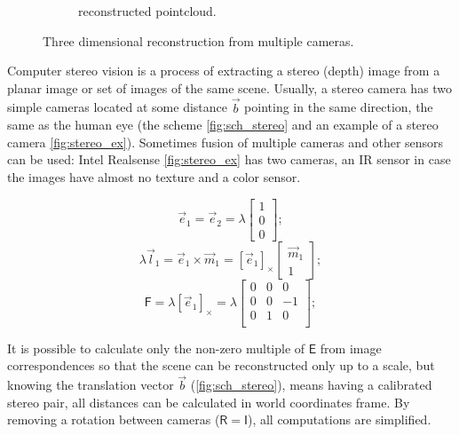 \begin{figure}[h]
\begin{subfigure}[b]{0.65\textwidth}
      \caption{reconstructed pointcloud.}
      \label{fig:pc_output}
    \end{subfigure}
    \caption{Three dimensional reconstruction from multiple cameras.}
    \label{fig:pc_recons}
\end{figure}

Computer stereo vision is a process of extracting a stereo (depth) image from a planar image or set of images of the same scene. Usually, a stereo camera has two simple cameras located at some distance $\vec{b}$ pointing in the same direction, the same as the human eye (the scheme \autoref{fig:sch_stereo} and an example of a stereo camera \autoref{fig:stereo_ex}). 
Sometimes fusion of multiple cameras and other sensors can be used:
Intel Realsense \autoref{fig:stereo_ex} has two cameras, an IR sensor in case the images have almost no texture and a color sensor. 

\begin{equation}
    \label{eq:e1e2}
    \vec{e}_1 = \vec{e}_2 = \lambda \begin{bmatrix} 1 \\ 0 \\ 0 \end{bmatrix};
\end{equation}
\begin{equation}
    \label{eq:e1m1}
    \lambda \vec{l}_1 = \vec{e}_1 \times \vec{m}_1 = [\vec{e}_1]_\times \begin{bmatrix} \vec{m}_1 \\ 1\end{bmatrix};
\end{equation}
\begin{equation}
    \label{eq:F_simple}
    \pmb{\mathsf{F}} = \lambda [\vec{e}_1]_\times = \lambda \begin{bmatrix}
        0 & 0 & 0 \\
        0 & 0 & -1 \\
        0 & 1 & 0 \\
    \end{bmatrix};
\end{equation}

It is possible to calculate only the non-zero multiple of $\pmb{\mathsf{E}}$ from image correspondences so that the scene can be reconstructed only up to a scale, but knowing the translation vector $\vec{b}$ (\autoref{fig:sch_stereo}), means having a calibrated stereo pair, all distances can be calculated in world coordinates frame.
By removing a rotation between cameras ($\pmb{\mathsf{R}} = \pmb{\mathsf{I}}$), all computations are simplified.


